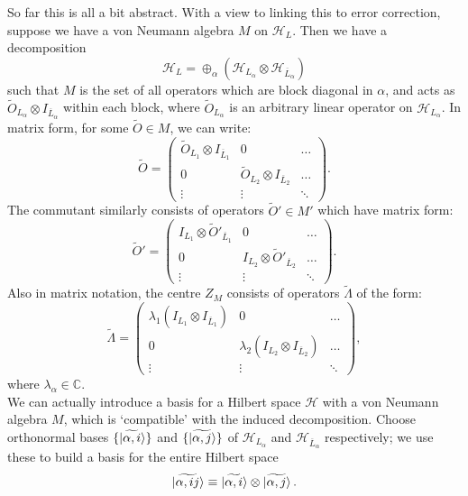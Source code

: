 \documentclass[12pt,a4paper]{report}
\numberwithin{equation}{section}
\newcommand{\ol}[1]{\overline{#1}}
\theoremstyle{definition}
\theoremstyle{theorem}
\theoremstyle{theorem}
\theoremstyle{example}
\theoremstyle{definition}
\begin{document}
So far this is all a bit abstract. With a view to linking this to error correction, suppose we have a von Neumann algebra $M$ on $\mathcal{H}_{L}$. Then we have a decomposition
\begin{equation}\label{decomp}
	\mathcal{H}_{L}=\oplus_{\alpha}(\mathcal{H}_{L_{\alpha}}\otimes\mathcal{H}_{\ol{L}_{\alpha}})
\end{equation} 
such that $M$ is the set of all operators which are block diagonal in $\alpha$, and acts as $\tilde{O}_{L_{\alpha}}\otimes I_{\ol{L}_{\alpha}}$ within each block, where $\tilde{O}_{L_{\alpha}}$ is an arbitrary linear operator on $\mathcal{H}_{L_{\alpha}}$. In matrix form, for some $\tilde{O}\in M$, we can write:
\begin{equation}\label{thing1}
	\tilde{O}=\begin{pmatrix}
		\tilde{O}_{L_{1}}\otimes I_{\ol{L}_{1}}&0&\dots\\
		0&\tilde{O}_{L_{2}}\otimes I_{\ol{L}_{2}}&\dots\\
		\vdots&\vdots&\ddots
	\end{pmatrix}.
\end{equation}
The commutant similarly consists of operators $\tilde{O}'\in M'$ which have matrix form:
\begin{equation}
	\tilde{O}'=\begin{pmatrix}
		I_{L_{1}}\otimes\tilde{O}'_{\ol{L}_{1}}&0&\dots\\
		0&I_{L_{2}}\otimes\tilde{O}'_{\ol{L}_{2}}&\dots\\
		\vdots&\vdots&\ddots
	\end{pmatrix}.
\end{equation}
Also in matrix notation, the centre $Z_{M}$ consists of operators $\tilde{\Lambda}$ of the form:
\begin{equation}
	\tilde{\Lambda}=\begin{pmatrix}
		\lambda_{1}(I_{L_{1}}\otimes I_{\ol{L}_{1}})&0&\dots\\
		0&\lambda_{2}(I_{L_{2}}\otimes I_{\ol{L}_{2}})&\dots\\
		\vdots&\vdots&\ddots
	\end{pmatrix},
\end{equation}
where $\lambda_{\alpha}\in\mathbb{C}$.\\
We can actually introduce a basis for a Hilbert space $\mathcal{H}$ with a von Neumann algebra $M$, which is `compatible' with the induced decomposition. Choose orthonormal bases $\{\ket{\widetilde{\alpha,i}}\}$ and $\{\ket{\widetilde{\alpha,j}}\}$ of $\mathcal{H}_{L_{\alpha}}$ and $\mathcal{H}_{\ol{L}_{\alpha}}$ respectively; we use these to build a basis for the entire Hilbert space
\begin{equation}\label{basis}
	\ket{\widetilde{\alpha,ij}}\equiv\ket{\widetilde{\alpha,i}}\otimes\ket{\widetilde{\alpha,j}}.
\end{equation}
\end{document}
